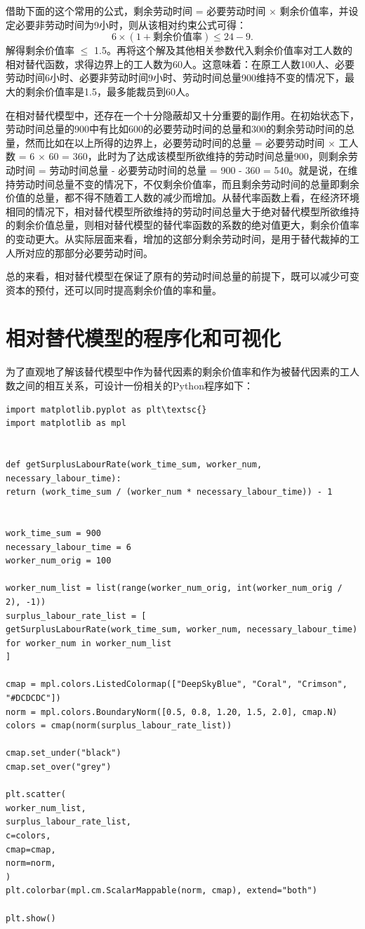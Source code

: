 \documentclass[a4paper,11pt]{ctexart}
\begin{document}
借助下面的这个常用的公式，剩余劳动时间 = 必要劳动时间 $\times$ 剩余价值率，并设定必要非劳动时间为9小时，则从该相对约束公式可得：$$6 \times (1 + \mbox{剩余价值率}) \le 24 - 9.$$解得剩余价值率 $\le$ 1.5。再将这个解及其他相关参数代入剩余价值率对工人数的相对替代函数，求得边界上的工人数为60人。这意味着：在原工人数100人、必要劳动时间6小时、必要非劳动时间9小时、劳动时间总量900维持不变的情况下，最大的剩余价值率是1.5，最多能裁员到60人。

在相对替代模型中，还存在一个十分隐蔽却又十分重要的副作用。在初始状态下，劳动时间总量的900中有比如600的必要劳动时间的总量和300的剩余劳动时间的总量，然而比如在以上所得的边界上，必要劳动时间的总量 = 必要劳动时间 $\times$ 工人数 = 6 $\times$ 60 = 360，此时为了达成该模型所欲维持的劳动时间总量900，则剩余劳动时间 = 劳动时间总量 - 必要劳动时间的总量 = 900 - 360 = 540。就是说，在维持劳动时间总量不变的情况下，不仅剩余价值率，而且剩余劳动时间的总量即剩余价值的总量，都不得不随着工人数的减少而增加。从替代率函数上看，在经济环境相同的情况下，相对替代模型所欲维持的劳动时间总量大于绝对替代模型所欲维持的剩余价值总量，则相对替代模型的替代率函数的系数的绝对值更大，剩余价值率的变动更大。从实际层面来看，增加的这部分剩余劳动时间，是用于替代裁掉的工人所对应的那部分必要劳动时间。

总的来看，相对替代模型在保证了原有的劳动时间总量的前提下，既可以减少可变资本的预付，还可以同时提高剩余价值的率和量。

\section{相对替代模型的程序化和可视化}

为了直观地了解该替代模型中作为替代因素的剩余价值率和作为被替代因素的工人数之间的相互关系，可设计一份相关的Python程序如下：

\begin{lstlisting}[style = python]
import matplotlib.pyplot as plt\textsc{}
import matplotlib as mpl


def getSurplusLabourRate(work_time_sum, worker_num, necessary_labour_time):
return (work_time_sum / (worker_num * necessary_labour_time)) - 1


work_time_sum = 900
necessary_labour_time = 6
worker_num_orig = 100

worker_num_list = list(range(worker_num_orig, int(worker_num_orig / 2), -1))
surplus_labour_rate_list = [
getSurplusLabourRate(work_time_sum, worker_num, necessary_labour_time)
for worker_num in worker_num_list
]

cmap = mpl.colors.ListedColormap(["DeepSkyBlue", "Coral", "Crimson", "#DCDCDC"])
norm = mpl.colors.BoundaryNorm([0.5, 0.8, 1.20, 1.5, 2.0], cmap.N)
colors = cmap(norm(surplus_labour_rate_list))

cmap.set_under("black")
cmap.set_over("grey")

plt.scatter(
worker_num_list,
surplus_labour_rate_list,
c=colors,
cmap=cmap,
norm=norm,
)
plt.colorbar(mpl.cm.ScalarMappable(norm, cmap), extend="both")

plt.show()


\end{lstlisting}
\end{document}
